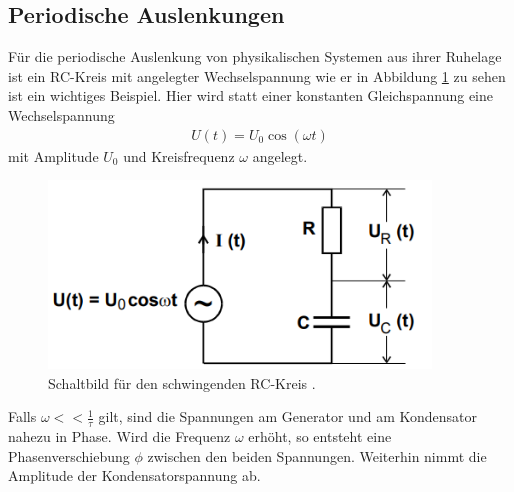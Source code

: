 \subsection{Periodische Auslenkungen}
Für die periodische Auslenkung von physikalischen Systemen aus ihrer Ruhelage ist ein RC-Kreis mit angelegter Wechselspannung
wie er in Abbildung \ref{fig:schwingend} zu sehen ist ein wichtiges Beispiel.
Hier wird statt einer konstanten Gleichspannung eine Wechselspannung 
\begin{align}
    U(t) = U_0 \cos(\omega t)
\end{align}
mit Amplitude $U_0$ und Kreisfrequenz $\omega$ angelegt. 
\begin{figure}[H]
    \centering
    \includegraphics[height=5cm]{abbildungen/oszillatorisch.png}
    \caption{Schaltbild für den schwingenden RC-Kreis \cite{man:v353}.}
    \label{fig:schwingend}
\end{figure}

\noindent
Falls $\omega << \frac{1}{\tau}$ gilt, sind die Spannungen am Generator und am Kondensator nahezu in Phase.
Wird die Frequenz $\omega$ erhöht, so entsteht eine Phasenverschiebung $\phi$ zwischen den beiden Spannungen.
Weiterhin nimmt die Amplitude der Kondensatorspannung ab.

